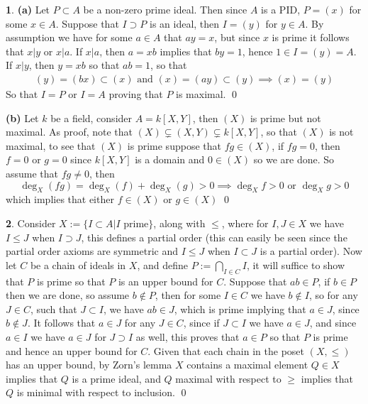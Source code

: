 \documentclass[11pt]{article}
\theoremstyle{definition}
\newtheorem{pb}{}
\newcommand{\set}[1]{\{#1\}}
\newcommand{\tand}{\text{ and }}
\newcommand{\tor}{\text{ or }}
\begin{document}
    \begin{pb}
        \textbf{(a)} Let \(P \subset A\) be a non-zero prime ideal. Then since \(A\) is a PID, \(P = (x)\) for some \(x \in A\). Suppose that \(I \supset P\) is an ideal, then \(I = (y)\) for \(y \in A\). By assumption we have for some \(a \in A\) that \(ay = x\), but since \(x\) is prime it follows that \(x \vert y\) or \(x \vert a\). If \(x \vert a\), then
        \(a = xb\) implies that \(by = 1\), hence \(1 \in I = (y) = A\). If \(x \vert y\), then \(y = xb\) so that \(ab = 1\), so that
        \begin{align*}
            (y) = (bx) \subset (x) \tand (x) = (ay) \subset (y) \implies (x) = (y)
        \end{align*}
        So that \(I = P\) or \(I = A\) proving that \(P\) is maximal. \qed

        \textbf{(b)} Let \(k\) be a field, consider \(A = k[X,Y]\), then \((X)\) is prime but not maximal. As proof, note that \((X) \subsetneq (X,Y) \subsetneq k[X,Y]\), so that \((X)\) is not maximal, to see that \((X)\) is prime suppose that \(fg \in (X)\), if \(fg = 0\), then \(f = 0 \tor g = 0\) since \(k[X,Y]\) is a domain and \(0 \in (X)\) so we are done. So assume that \(fg \neq 0\), then
        \[\deg_X(fg) = \deg_X(f) + \deg_X(g) > 0 \implies \deg_X f > 0 \tor \deg_X g > 0\]
        which implies that  either \(f \in (X)\) or \(g \in (X)\) \qed
    \end{pb}
    \begin{pb}
        Consider \(X := \set{I \subset A \vert I \text{ prime}}\), along with \(\leq\), where for \(I,J \in X\) we have \(I \leq J\) when \(I \supset J\), this defines a partial order (this can easily be seen since the partial order axioms are symmetric and \(I \leq J\) when \(I \subset J\) is a partial order). Now let \(C\) be a chain of ideals  in \(X\), and define \(P := \bigcap_{I \in C} I\), it will suffice to show that \(P\) is prime so that \(P\) is an upper bound for \(C\). Suppose that \(ab \in P\), if \(b \in P\) then we are done, so assume \(b \not \in P\), then for some \(I \in C\) we have \(b \not \in I\), so for any  \(J \in C\), such that \(J \subset I\), we have \(ab \in J\), which is prime implying that \(a \in J\), since \(b \not \in J\). It follows that \(a \in J\) for any \(J \in C\), since if \(J \subset I\) we have \(a \in J\), and since \(a \in I\) we have \(a \in J\) for \(J \supset I\) as well, this proves that \(a \in P\) so that \(P\) is prime and hence an upper bound for \(C\). Given that each chain in the poset \((X,\leq)\) has an upper bound, by Zorn's lemma \(X\) contains a maximal element \(Q \in X\) implies that \(Q\) is a prime ideal, and \(Q\) maximal with respect to \(\geq\) implies that \(Q\) is minimal with respect to inclusion. \qed
    \end{pb}
\end{document}
